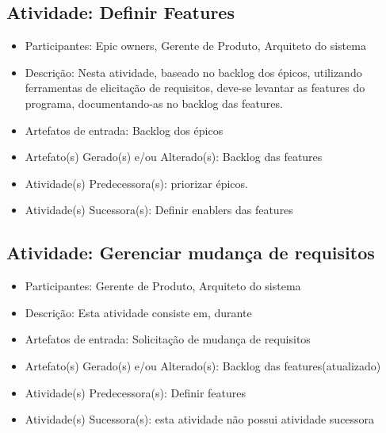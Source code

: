
\subsection{Atividade: Definir Features}
\begin{itemize}
\item Participantes: Epic owners, Gerente de Produto, Arquiteto do sistema

\item Descrição: Nesta atividade, baseado no backlog dos épicos, utilizando ferramentas de elicitação de requisitos, deve-se levantar as features do programa, documentando-as no backlog das features.

\item Artefatos de entrada: Backlog dos épicos

\item Artefato(s) Gerado(s) e/ou Alterado(s): Backlog das features

\item Atividade(s) Predecessora(s): priorizar épicos.
  
\item Atividade(s) Sucessora(s): Definir enablers das features
\end{itemize}

\subsection{Atividade: Gerenciar mudança de requisitos}
\begin{itemize}
\item Participantes: Gerente de Produto, Arquiteto do sistema

\item Descrição: Esta atividade consiste em, durante 

\item Artefatos de entrada: Solicitação de mudança de requisitos

\item Artefato(s) Gerado(s) e/ou Alterado(s): Backlog das features(atualizado) 

\item Atividade(s) Predecessora(s): Definir features
  
\item Atividade(s) Sucessora(s): esta atividade não possui atividade sucessora
\end{itemize}

